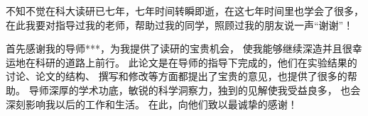 
\begin{acknowledgments}

  不知不觉在科大读研已七年，七年时间转瞬即逝，在这七年时间里也学会了很多，
  在此我要对指导过我的老师，帮助过我的同学，照顾过我的朋友说一声“谢谢”！

  首先感谢我的导师***，为我提供了读研的宝贵机会，
  使我能够继续深造并且很幸运地在科研的道路上前行。
  此论文是在导师的指导下完成的，他们在实验结果的讨论、论文的结构、
  撰写和修改等方面都提出了宝贵的意见，也提供了很多的帮助。
  导师深厚的学术功底，敏锐的科学洞察力，独到的见解使我受益良多，
  也会深刻影响我以后的工作和生活。
  在此，向他们致以最诚挚的感谢！

\end{acknowledgments}
